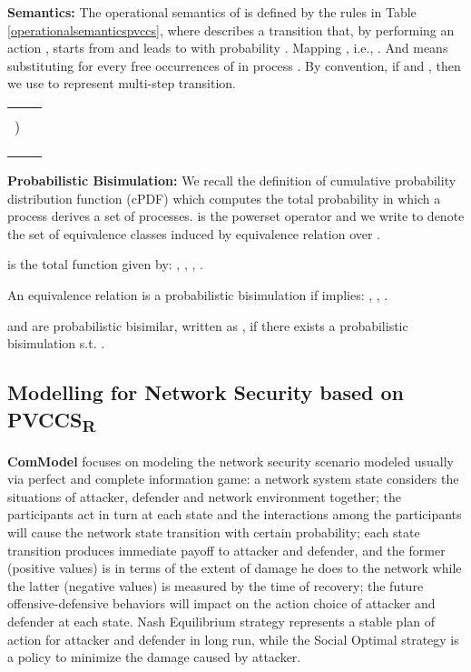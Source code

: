\documentclass{acm_proc_article-sp}
\begin{document}
\textbf{Semantics:}
The operational semantics of  is defined by the rules in Table \ref{operationalsemanticspvccs}, where  describes a transition that, by performing an action , starts from  and leads to  with probability . Mapping , i.e., . And  means substituting  for every free occurrences of  in process . By convention, if  and , then we use  to represent multi-step transition.
\begin{table*}
\centering
\renewcommand{\arraystretch}{2.5}
\begin{tabular}{ll}\hline
&
\\
) &
\\
&
\\
 & \\
 & \\
\hline
\end{tabular}
\caption{\label{operationalsemanticspvccs}Operational semantics of }
\end{table*}

\textbf{Probabilistic Bisimulation:}
We recall the definition of \textsf{cumulative probability distribution function} (cPDF) \cite{rob} which computes the total probability in which a process derives a set of processes.  is the powerset operator and we write  to denote the set of equivalence classes induced by equivalence relation  over .
\begin{definition}
 is the total function given by: , , , . \end{definition}

\begin{definition}
An equivalence relation  is a \textsf{probabilistic bisimulation} if  implies: , , .
\end{definition}
 and  are probabilistic bisimilar, written as , if there exists a probabilistic bisimulation  s.t. .

\subsection{Modelling for Network Security based on  PVCCS\textsubscript{R}}
\textbf{ComModel} focuses on modeling the network security scenario modeled usually via perfect and complete information game: a network system state considers the situations of attacker, defender and network environment together; the participants act in turn at each state and the interactions among the participants will cause the network state transition with certain probability; each state transition produces immediate payoff to attacker and defender, and the former (positive values) is in terms of the extent of damage he does to the network while the latter (negative values) is measured by the time of recovery; the future offensive-defensive behaviors will impact on the action choice of attacker and defender at each state. Nash Equilibrium strategy represents a stable plan of action for attacker and defender in long run, while the Social Optimal strategy is a policy to minimize the damage caused by attacker.
\end{document}
